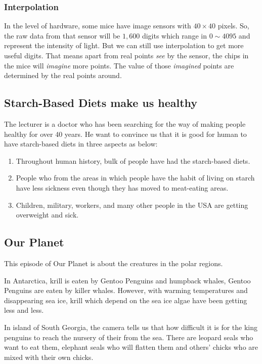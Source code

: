 \documentclass{article}
\begin{document}
\subsubsection{Interpolation}
In the level of hardware, some mice have image sensors with $40 \times 40$ pixels. So, the raw data from that sensor will be $1,600$ digits which range in $0 \sim 4095$ and represent the intensity of light. But we can still use interpolation to get more useful digits. That means apart from real points \emph{see} by the sensor, the chips in the mice will \emph{imagine} more points. The value of those \emph{imagined} points are determined by the real points around.

\subsection{Starch-Based Diets make us healthy}
The lecturer is a doctor who has been searching for the way of making people healthy for over 40 years. He want to convince us that it is good for human to have starch-based diets in three aspects as below:

\begin{enumerate}
	\item Throughout human history, bulk of people have had the starch-based diets.
	\item People who from the areas in which people have the habit of living on starch have less sickness even though they has moved to meat-eating areas.
	\item Children, military, workers, and many other people in the USA are getting overweight and sick.
\end{enumerate}

\subsection{Our Planet}
This episode of Our Planet is about the creatures in the polar regions.

In Antarctica, krill is eaten by Gentoo Penguins and humpback whales, Gentoo Penguins are eaten by killer whales. However, with warming temperatures and disappearing sea ice, krill which depend on the sea ice algae have been getting less and less.

In island of South Georgia, the camera tells us that how difficult it is for the king penguins to reach the nursery of their from the sea. There are leopard seals who want to eat them, elephant seals who will flatten them and others' chicks who are mixed with their own chicks.
\end{document}

